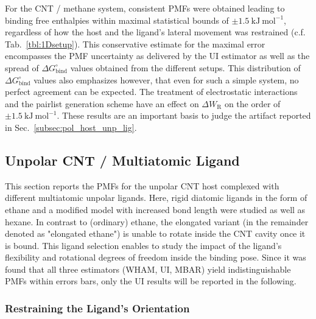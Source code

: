 \documentclass[9pt,lessons,pubversion]{livecoms}
\begin{document}
For the CNT / methane system, consistent PMFs were obtained leading to binding free enthalpies within maximal statistical bounds of 
$\pm 1.5~\mathrm{kJ}~\mathrm{mol}^{-1}$, regardless of how the host and the ligand's lateral movement was restrained (c.f. Tab.~\ref{tbl:1Dsetup}).
This conservative estimate for the maximal error encompasses the PMF uncertainty as delivered by the UI estimator as well as the spread of $\Delta G^\circ_\mathrm{bind}$ values obtained from the different setups. 
This distribution of $\Delta G^\circ_\mathrm{bind}$ values also emphasizes however, that even for such a simple system, no perfect agreement can be expected.
The treatment of electrostatic interactions and the pairlist generation scheme have an effect on $\Delta W_\mathrm{R}$ on the order of $\pm 1.5~\mathrm{kJ}~\mathrm{mol}^{-1}$.
These results are an important basis to judge the artifact reported in Sec.~\ref{subsec:pol_host_unp_lig}. 


\subsection{Unpolar CNT / Multiatomic Ligand}
\label{subsec:unp_host_unp_lig}

This section reports the PMFs for the unpolar CNT host complexed with different multiatomic unpolar ligands.
Here, rigid diatomic ligands in the form of ethane and a modified model with increased bond length were studied as well as hexane.
In contrast to (ordinary) ethane, the elongated variant (in the remainder denoted as "elongated ethane")  is unable to rotate inside the CNT cavity once it is bound.
This ligand selection enables to study the impact of the ligand's flexibility and rotational degrees of freedom inside the binding pose. 
Since it was found that all three estimators (WHAM, UI, MBAR) yield indistinguishable PMFs within errors bars, only the UI results will be reported in the following.


\subsubsection*{Restraining the Ligand's Orientation}
\label{subsubsec:orirest}
\end{document}
